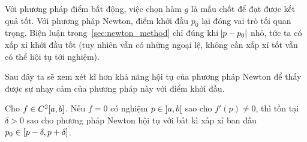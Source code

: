 \documentclass[../../Lectures]{subfiles}
\begin{document}
Với phương pháp điểm bất động, việc chọn hàm \(g\) là mấu chốt để đạt được kết
quả tốt. Với phương pháp Newton, điểm khởi đầu \(p_0\) lại đóng vai trò tối quan
trọng. Biện luận trong~\ref{sec:newton_method} chỉ đúng khi \(\abs{p - p_0}\)
nhỏ, tức ta có xấp xỉ khởi đầu tốt (tuy nhiên vẫn có những ngoại lệ, không cần
xấp xỉ tốt vẫn có thể hội tụ tới nghiệm).

Sau đây ta sẽ xem xét kĩ hơn khả năng hội tụ của phương pháp Newton để thấy được
sự nhạy cảm của phương pháp này với điểm khởi đầu.

\begin{theorem}
    Cho \(f \in C^2 \interval{a}{b}\). Nếu \(f = 0\) có nghiệm \(p \in
    \interval[open]{a}{b}\) sao cho \(f'(p) \neq 0\), thì tồn tại \(\delta > 0\)
    sao cho phương pháp Newton hội tụ với bất kì xấp xỉ ban đầu \(p_0 \in
    \interval{p - \delta}{p + \delta}\).
\end{theorem}
\end{document}
